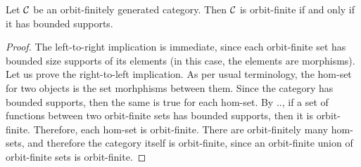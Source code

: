 \begin{lemma}\label{lem:bounded-supports}
    Let ${\mathcal C}$ be an orbit-finitely generated category. Then ${\mathcal C}$ is orbit-finite if and only if it has bounded supports.  
\end{lemma}
\begin{proof}
    The left-to-right implication is immediate, since each orbit-finite set has bounded size supports of its elements (in this case, the elements are morphisms). Let us prove the right-to-left implication. 
    As per usual terminology, the hom-set for two objects is the set morhphisms between them. Since the category has bounded supports, then the same is true for each hom-set. By .., if a set of functions between two orbit-finite sets has bounded supports, then it is orbit-finite. Therefore, each hom-set is orbit-finite. There are orbit-finitely many hom-sets, and therefore the category itself is orbit-finite, since an orbit-finite union of orbit-finite sets is orbit-finite.
\end{proof}

